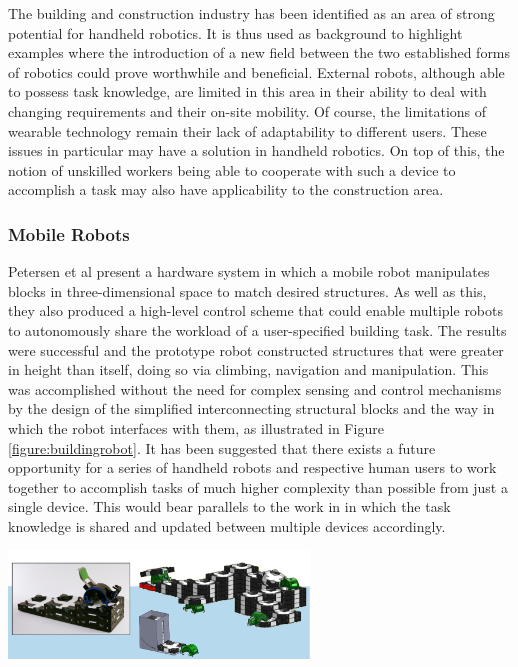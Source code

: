 \documentclass[11pt]{article}
\begin{document}
The building and construction industry has been identified as an area of strong potential for handheld robotics. It is thus used as background to highlight examples where the introduction of a new field between the two established forms of robotics could prove worthwhile and beneficial. External robots, although able to possess task knowledge, are limited in this area in their ability to deal with changing requirements and their on-site mobility. Of course, the limitations of wearable technology remain their lack of adaptability to different users. These issues in particular may have a solution in handheld robotics. On top of this, the notion of unskilled workers being able to cooperate with such a device to accomplish a task may also have applicability to the construction area.

\subsubsection{Mobile Robots} \label{mobilerobots}
Petersen et al \cite{Petersen2011} present a hardware system in which a mobile robot manipulates blocks in three-dimensional space to match desired structures. As well as this, they also produced a high-level control scheme that could enable multiple robots to autonomously share the workload of a user-specified building task. The results were successful and the prototype robot constructed structures that were greater in height than itself, doing so via climbing, navigation and manipulation. This was accomplished without the need for complex sensing and control mechanisms by the design of the simplified interconnecting structural blocks and the way in which the robot interfaces with them, as illustrated in Figure \ref{figure:buildingrobot}. It has been suggested that there exists a future opportunity for a series of handheld robots and respective human users to work together to accomplish tasks of much higher complexity than possible from just a single device. This would bear parallels to the work in \cite{Petersen2011} in which the task knowledge is shared and updated between multiple devices accordingly.

\begin{center}
\includegraphics[width = 0.6\textwidth]{buildingrobot.png}
\label{figure:buildingrobot}
\end{center}
\end{document}
